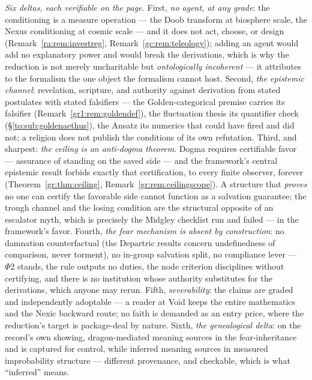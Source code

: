 \documentclass[11pt]{article}
\numberwithin{equation}{section}
\theoremstyle{plain}
\theoremstyle{definition}
\theoremstyle{remark}
\begin{document}
\emph{Six deltas, each verifiable on the page.} First, \emph{no
agent, at any grade}: the conditioning is a measure operation --- the
Doob transform at biosphere scale, the Nexus conditioning at cosmic
scale --- and it does not act, choose, or design
(Remark~\ref{ra:rem:investreg}, Remark~\ref{gc:rem:teleology});
adding an agent would add no explanatory power and would break the
derivations, which is why the reduction is not merely uncharitable
but \emph{ontologically incoherent} --- it attributes to the
formalism the one object the formalism cannot host. Second, \emph{the
epistemic channel}: revelation, scripture, and authority against
derivation from stated postulates with stated falsifiers --- the
Golden-categorical premise carries its falsifier
(Remark~\ref{gr1:rem:goldendef}), the fluctuation thesis its
quantifier check (\S\ref{to:sub:goldenaethus}), the Ansatz its
numerics that could have fired and did not; a religion does not
publish the conditions of its own refutation. Third, and sharpest:
\emph{the ceiling is an anti-dogma theorem}. Dogma requires
certifiable favor --- assurance of standing on the saved side --- and
the framework's central epistemic result forbids exactly that
certification, to every finite observer, forever
(Theorem~\ref{gr:thm:ceiling}, Remark~\ref{gr:rem:ceilingscope}). A
structure that \emph{proves} no one can certify the favorable side
cannot function as a salvation guarantee; the trough channel and the
losing condition are the structural opposite of an escalator myth,
which is precisely the Midgley checklist run and failed --- in the
framework's favor. Fourth, \emph{the fear mechanism is absent by
construction}: no damnation counterfactual (the Departric results
concern undefinedness of comparison, never torment), no in-group
salvation split, no compliance lever --- $\Phi2$ stands, the rule
outputs no duties, the node criterion disciplines without
certifying, and there is no institution whose authority substitutes
for the derivations, which anyone may rerun. Fifth,
\emph{severability}: the claims are graded and independently
adoptable --- a reader at Void keeps the entire mathematics and the
Nexic backward route; no faith is demanded as an entry price, where
the reduction's target is package-deal by nature. Sixth, \emph{the
genealogical delta}: on the record's own showing, dragon-mediated
meaning sources in the fear-inheritance and is captured for control,
while inferred meaning sources in measured improbability structure
--- different provenance, and checkable, which is what
``inferred'' means.
\end{document}
